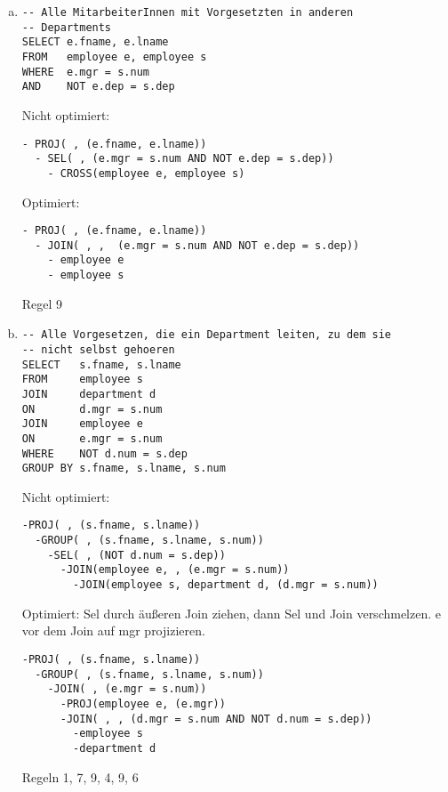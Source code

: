 \cprotEnv
\begin{normalText}
\begin{enumerate}[a)]
	\item
\begin{lstlisting}
-- Alle MitarbeiterInnen mit Vorgesetzten in anderen
-- Departments
SELECT e.fname, e.lname
FROM   employee e, employee s
WHERE  e.mgr = s.num
AND    NOT e.dep = s.dep
\end{lstlisting}

\cprotEnv
\begin{note}
Nicht optimiert:
\begin{lstlisting}
- PROJ( , (e.fname, e.lname))
  - SEL( , (e.mgr = s.num AND NOT e.dep = s.dep))
    - CROSS(employee e, employee s)
\end{lstlisting}
Optimiert:
\begin{lstlisting}
- PROJ( , (e.fname, e.lname))
  - JOIN( , ,  (e.mgr = s.num AND NOT e.dep = s.dep))
    - employee e
    - employee s
\end{lstlisting}
Regel 9
\end{note}

\item

\begin{lstlisting}
-- Alle Vorgesetzen, die ein Department leiten, zu dem sie
-- nicht selbst gehoeren
SELECT   s.fname, s.lname
FROM     employee s
JOIN     department d
ON       d.mgr = s.num
JOIN     employee e
ON       e.mgr = s.num
WHERE    NOT d.num = s.dep
GROUP BY s.fname, s.lname, s.num
\end{lstlisting}
\cprotEnv
\begin{note}
Nicht optimiert:
\begin{lstlisting}
-PROJ( , (s.fname, s.lname))
  -GROUP( , (s.fname, s.lname, s.num))
    -SEL( , (NOT d.num = s.dep))
      -JOIN(employee e, , (e.mgr = s.num))
        -JOIN(employee s, department d, (d.mgr = s.num))
\end{lstlisting}
  Optimiert: Sel durch äußeren Join ziehen, dann Sel und Join verschmelzen.
  e vor dem Join auf mgr projizieren.\\
\begin{lstlisting}
-PROJ( , (s.fname, s.lname))
  -GROUP( , (s.fname, s.lname, s.num))
    -JOIN( , (e.mgr = s.num))
      -PROJ(employee e, (e.mgr))
      -JOIN( , , (d.mgr = s.num AND NOT d.num = s.dep))
        -employee s
        -department d

\end{lstlisting}
Regeln 1, 7, 9, 4, 9, 6
\end{note}


\end{enumerate}
\end{normalText}

